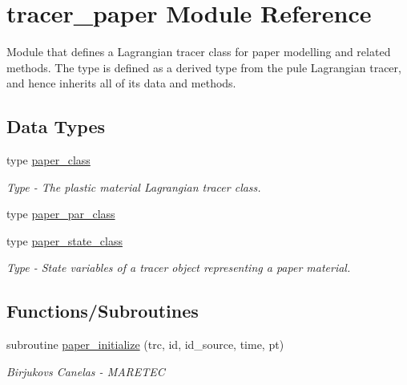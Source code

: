 \hypertarget{namespacetracer__paper}{}\section{tracer\+\_\+paper Module Reference}
\label{namespacetracer__paper}


Module that defines a Lagrangian tracer class for paper modelling and related methods. The type is defined as a derived type from the pule Lagrangian tracer, and hence inherits all of it\textquotesingle{}s data and methods.  


\subsection*{Data Types}
\begin{DoxyCompactItemize}
\item 
type \mbox{\hyperlink{structtracer__paper_1_1paper__class}{paper\+\_\+class}}
\begin{DoxyCompactList}\small\item\em Type -\/ The plastic material Lagrangian tracer class. \end{DoxyCompactList}\item 
type \mbox{\hyperlink{structtracer__paper_1_1paper__par__class}{paper\+\_\+par\+\_\+class}}
\item 
type \mbox{\hyperlink{structtracer__paper_1_1paper__state__class}{paper\+\_\+state\+\_\+class}}
\begin{DoxyCompactList}\small\item\em Type -\/ State variables of a tracer object representing a paper material. \end{DoxyCompactList}\end{DoxyCompactItemize}
\subsection*{Functions/\+Subroutines}
\begin{DoxyCompactItemize}
\item 
subroutine \mbox{\hyperlink{namespacetracer__paper_aad494497e50de353bb7458cc82fd617d}{paper\+\_\+initialize}} (trc, id, id\+\_\+source, time, pt)
\begin{DoxyCompactList}\small\item\em Birjukovs Canelas -\/ M\+A\+R\+E\+T\+EC \end{DoxyCompactList}\end{DoxyCompactItemize}


